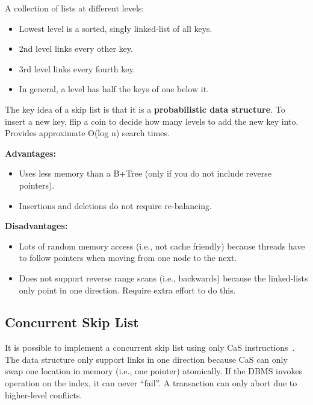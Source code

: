 \documentclass[11pt]{article}
\begin{document}
A collection of lists at different levels:
\begin{itemize}
    \item
    Lowest level is a sorted, singly linked-list of all keys.
    
    \item
    2nd level links every other key.
    
    \item
    3rd level links every fourth key.
    
    \item
    In general, a level has half the keys of one below it.
\end{itemize}
    
The key idea of a skip list is that it is a \textbf{probabilistic data structure}. To insert a new 
key, flip a coin to decide how many levels to add the new key into. 
Provides approximate O(log n) search times.

\textbf{Advantages:}
\begin{itemize}
    \item
    Uses less memory than a B+Tree (only if you do not include reverse pointers).
    
    \item
    Insertions and deletions do not require re-balancing.
\end{itemize}

\textbf{Disadvantages:}
\begin{itemize}
    \item
    Lots of random memory access (i.e., not cache friendly) because threads have to follow pointers 
    when moving from one node to the next.
    
    \item
    Does not support reverse range scans (i.e., backwards) because the linked-lists only point in 
    one direction. Require extra effort to do this.
\end{itemize}

\subsection*{Concurrent Skip List}
It is possible to implement a concurrent skip list using only CaS 
instructions~\cite{hpugh-concurrent-tr1990}. The data structure only support links in one direction 
because CaS can only swap one location in memory (i.e., one pointer) atomically.
If the DBMS invokes operation on the index, it can never ``fail''. A transaction can only abort due 
to higher-level conflicts.
\end{document}
